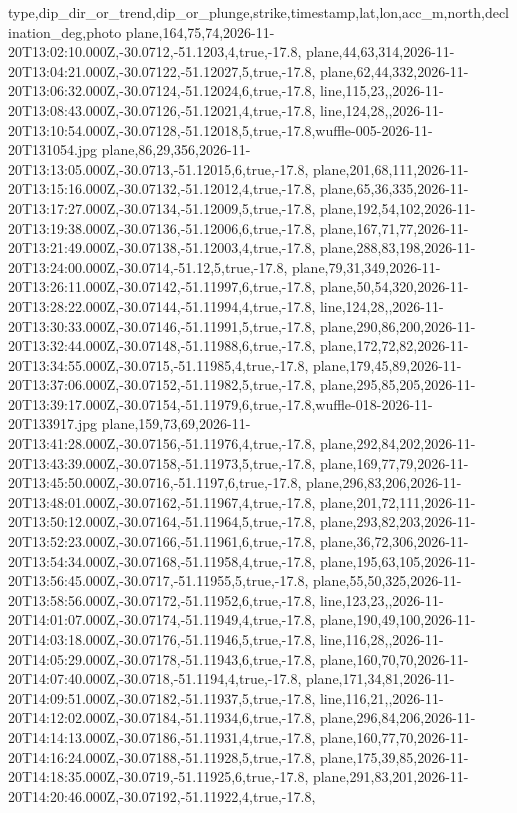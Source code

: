 \begin{codeblocktiny}
type,dip_dir_or_trend,dip_or_plunge,strike,timestamp,lat,lon,acc_m,north,declination_deg,photo
plane,164,75,74,2026-11-20T13:02:10.000Z,-30.0712,-51.1203,4,true,-17.8,
plane,44,63,314,2026-11-20T13:04:21.000Z,-30.07122,-51.12027,5,true,-17.8,
plane,62,44,332,2026-11-20T13:06:32.000Z,-30.07124,-51.12024,6,true,-17.8,
line,115,23,,2026-11-20T13:08:43.000Z,-30.07126,-51.12021,4,true,-17.8,
line,124,28,,2026-11-20T13:10:54.000Z,-30.07128,-51.12018,5,true,-17.8,wuffle-005-2026-11-20T131054.jpg
plane,86,29,356,2026-11-20T13:13:05.000Z,-30.0713,-51.12015,6,true,-17.8,
plane,201,68,111,2026-11-20T13:15:16.000Z,-30.07132,-51.12012,4,true,-17.8,
plane,65,36,335,2026-11-20T13:17:27.000Z,-30.07134,-51.12009,5,true,-17.8,
plane,192,54,102,2026-11-20T13:19:38.000Z,-30.07136,-51.12006,6,true,-17.8,
plane,167,71,77,2026-11-20T13:21:49.000Z,-30.07138,-51.12003,4,true,-17.8,
plane,288,83,198,2026-11-20T13:24:00.000Z,-30.0714,-51.12,5,true,-17.8,
plane,79,31,349,2026-11-20T13:26:11.000Z,-30.07142,-51.11997,6,true,-17.8,
plane,50,54,320,2026-11-20T13:28:22.000Z,-30.07144,-51.11994,4,true,-17.8,
line,124,28,,2026-11-20T13:30:33.000Z,-30.07146,-51.11991,5,true,-17.8,
plane,290,86,200,2026-11-20T13:32:44.000Z,-30.07148,-51.11988,6,true,-17.8,
plane,172,72,82,2026-11-20T13:34:55.000Z,-30.0715,-51.11985,4,true,-17.8,
plane,179,45,89,2026-11-20T13:37:06.000Z,-30.07152,-51.11982,5,true,-17.8,
plane,295,85,205,2026-11-20T13:39:17.000Z,-30.07154,-51.11979,6,true,-17.8,wuffle-018-2026-11-20T133917.jpg
plane,159,73,69,2026-11-20T13:41:28.000Z,-30.07156,-51.11976,4,true,-17.8,
plane,292,84,202,2026-11-20T13:43:39.000Z,-30.07158,-51.11973,5,true,-17.8,
plane,169,77,79,2026-11-20T13:45:50.000Z,-30.0716,-51.1197,6,true,-17.8,
plane,296,83,206,2026-11-20T13:48:01.000Z,-30.07162,-51.11967,4,true,-17.8,
plane,201,72,111,2026-11-20T13:50:12.000Z,-30.07164,-51.11964,5,true,-17.8,
plane,293,82,203,2026-11-20T13:52:23.000Z,-30.07166,-51.11961,6,true,-17.8,
plane,36,72,306,2026-11-20T13:54:34.000Z,-30.07168,-51.11958,4,true,-17.8,
plane,195,63,105,2026-11-20T13:56:45.000Z,-30.0717,-51.11955,5,true,-17.8,
plane,55,50,325,2026-11-20T13:58:56.000Z,-30.07172,-51.11952,6,true,-17.8,
line,123,23,,2026-11-20T14:01:07.000Z,-30.07174,-51.11949,4,true,-17.8,
plane,190,49,100,2026-11-20T14:03:18.000Z,-30.07176,-51.11946,5,true,-17.8,
line,116,28,,2026-11-20T14:05:29.000Z,-30.07178,-51.11943,6,true,-17.8,
plane,160,70,70,2026-11-20T14:07:40.000Z,-30.0718,-51.1194,4,true,-17.8,
plane,171,34,81,2026-11-20T14:09:51.000Z,-30.07182,-51.11937,5,true,-17.8,
line,116,21,,2026-11-20T14:12:02.000Z,-30.07184,-51.11934,6,true,-17.8,
plane,296,84,206,2026-11-20T14:14:13.000Z,-30.07186,-51.11931,4,true,-17.8,
plane,160,77,70,2026-11-20T14:16:24.000Z,-30.07188,-51.11928,5,true,-17.8,
plane,175,39,85,2026-11-20T14:18:35.000Z,-30.0719,-51.11925,6,true,-17.8,
plane,291,83,201,2026-11-20T14:20:46.000Z,-30.07192,-51.11922,4,true,-17.8,
\end{codeblocktiny}


